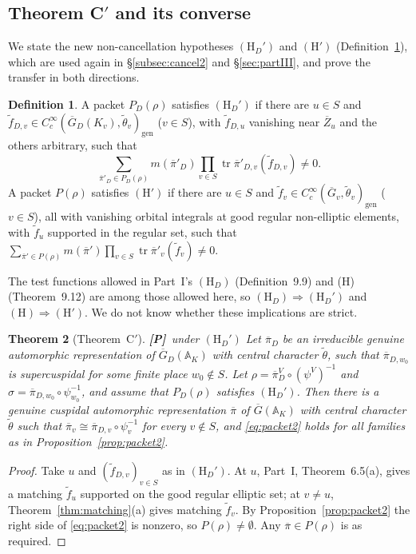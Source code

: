\documentclass[12pt]{article}
\newcommand{\ov}[1]{\overline{#1}}
\newcommand{\A}{\mathbb{A}}
\newcommand{\gen}{\mathrm{gen}}
\newcommand{\tr}{\operatorname{tr}}
\newcommand{\Gb}{\ov{G}}
\newcommand{\Zb}{\ov{Z}}
\newcommand{\GDb}{\ov{G}_D}
\newcommand{\pib}{\ov{\pi}}
\newcommand{\Pv}{\textbf{[P]}}
\theoremstyle{plain}
\newtheorem{theorem}{Theorem}[section]
\theoremstyle{definition}
\newtheorem{definition}[theorem]{Definition}
\begin{document}
\subsection{Theorem C$'$ and its converse}\label{subsec:Cprime}
We state the new non-cancellation hypotheses $(\mathrm H_D')$ and $(\mathrm H')$ (Definition~\ref{def:HDprime}), which are used again in \S\ref{subsec:cancel2} and \S\ref{sec:partIII}, and prove the transfer in both directions.

\begin{definition}\label{def:HDprime}
A packet $P_D(\rho)$ satisfies $(\mathrm H_D')$ if there are $u\in S$ and $\tilde f_{D,v}\in C_c^\infty(\GDb(K_v),\tilde\theta_v)_\gen$ ($v\in S$), with $\tilde f_{D,u}$ vanishing near $\Zb_u$ and the others arbitrary, such that
\[ \sum_{\pib'_D\in P_D(\rho)}m(\pib'_D)\prod_{v\in S}\tr\pib'_{D,v}(\tilde f_{D,v})\neq0 . \]
A packet $P(\rho)$ satisfies $(\mathrm H')$ if there are $u\in S$ and $\tilde f_v\in C_c^\infty(\Gb_v,\tilde\theta_v)_\gen$ ($v\in S$), all with vanishing orbital integrals at good regular non-elliptic elements, with $\tilde f_u$ supported in the regular set, such that $\sum_{\pib'\in P(\rho)}m(\pib')\prod_{v\in S}\tr\pib'_v(\tilde f_v)\ne0$.
\end{definition}

The test functions allowed in Part~I's $(\mathrm H_D)$ (Definition~9.9) and (H) (Theorem~9.12) are among those allowed here, so $(\mathrm H_D)\Rightarrow(\mathrm H_D')$ and $(\mathrm H)\Rightarrow(\mathrm H')$. We do not know whether these implications are strict.

\begin{theorem}[Theorem~C$'$]\label{thm:Cprime}\Pv\ under $(\mathrm H_D')$
Let $\pib_D$ be an irreducible genuine automorphic representation of $\GDb(\A_K)$ with central character $\tilde\theta$, such that $\pib_{D,w_0}$ is supercuspidal for some finite place $w_0\notin S$. Let $\rho=\pib_D^V\circ(\psi^V)^{-1}$ and $\sigma=\pib_{D,w_0}\circ\psi_{w_0}^{-1}$, and assume that $P_D(\rho)$ satisfies $(\mathrm H_D')$. Then there is a genuine cuspidal automorphic representation $\pib$ of $\Gb(\A_K)$ with central character $\tilde\theta$ such that $\pib_v\cong\pib_{D,v}\circ\psi_v^{-1}$ for every $v\notin S$, and \eqref{eq:packet2} holds for all families as in Proposition~\ref{prop:packet2}.
\end{theorem}
\begin{proof}
Take $u$ and $(\tilde f_{D,v})_{v\in S}$ as in $(\mathrm H_D')$. At $u$, Part~I, Theorem~6.5(a), gives a matching $\tilde f_u$ supported on the good regular elliptic set; at $v\ne u$, Theorem~\ref{thm:matching}(a) gives matching $\tilde f_v$. By Proposition~\ref{prop:packet2} the right side of \eqref{eq:packet2} is nonzero, so $P(\rho)\ne\emptyset$. Any $\pib\in P(\rho)$ is as required.
\end{proof}
\end{document}
